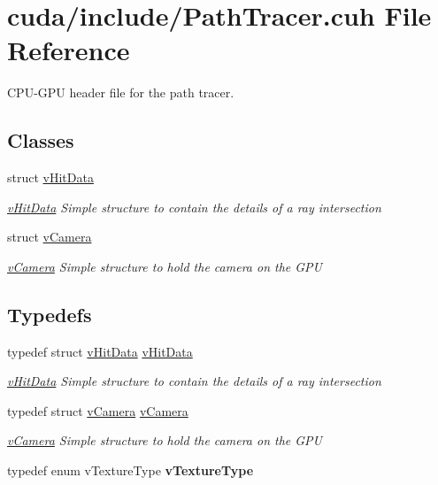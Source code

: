 \hypertarget{PathTracer_8cuh}{\section{cuda/include/\-Path\-Tracer.cuh File Reference}
\label{PathTracer_8cuh}
}


C\-P\-U-\/\-G\-P\-U header file for the path tracer.  


\subsection*{Classes}
\begin{DoxyCompactItemize}
\item 
struct \hyperlink{structvHitData}{v\-Hit\-Data}
\begin{DoxyCompactList}\small\item\em \hyperlink{structvHitData}{v\-Hit\-Data} Simple structure to contain the details of a ray intersection \end{DoxyCompactList}\item 
struct \hyperlink{structvCamera}{v\-Camera}
\begin{DoxyCompactList}\small\item\em \hyperlink{structvCamera}{v\-Camera} Simple structure to hold the camera on the G\-P\-U \end{DoxyCompactList}\end{DoxyCompactItemize}
\subsection*{Typedefs}
\begin{DoxyCompactItemize}
\item 
\hypertarget{PathTracer_8cuh_ab0980ebae247252f2beee460a03cf862}{typedef struct \hyperlink{structvHitData}{v\-Hit\-Data} \hyperlink{PathTracer_8cuh_ab0980ebae247252f2beee460a03cf862}{v\-Hit\-Data}}\label{PathTracer_8cuh_ab0980ebae247252f2beee460a03cf862}

\begin{DoxyCompactList}\small\item\em \hyperlink{structvHitData}{v\-Hit\-Data} Simple structure to contain the details of a ray intersection \end{DoxyCompactList}\item 
\hypertarget{PathTracer_8cuh_adbedd15ec953599468bbe7ae8bf171d6}{typedef struct \hyperlink{structvCamera}{v\-Camera} \hyperlink{PathTracer_8cuh_adbedd15ec953599468bbe7ae8bf171d6}{v\-Camera}}\label{PathTracer_8cuh_adbedd15ec953599468bbe7ae8bf171d6}

\begin{DoxyCompactList}\small\item\em \hyperlink{structvCamera}{v\-Camera} Simple structure to hold the camera on the G\-P\-U \end{DoxyCompactList}\item 
\hypertarget{PathTracer_8cuh_a93828196c8c7f7356a7a2e029724a122}{typedef enum v\-Texture\-Type {\bfseries v\-Texture\-Type}}\label{PathTracer_8cuh_a93828196c8c7f7356a7a2e029724a122}

\end{DoxyCompactItemize}
